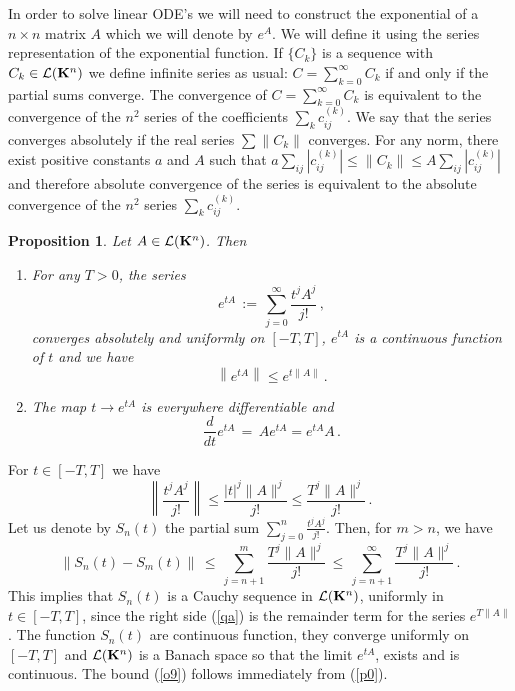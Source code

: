 \documentclass[12pt]{report}
\newcommand{\calL}{{\cal L}}
\newcommand{\bK}{{\bf K}}
\newtheorem{prop}[theorem]{Proposition}
\newcommand{\proof}{\noindent {\em Proof:~}}
\def\eqref#1{(\ref{#1})}
\def\to{\rightarrow}
\begin{document}
In order to solve linear ODE's we will need to construct the
exponential of a $n \times n$ matrix $A$ which we will denote by
$e^A$.  We will define it using the series representation of the
exponential function.  If $\{C_k\}$ is a sequence with $C_k \in
\calL(\bK^n)$ we define infinite series as usual: $C
=\sum_{k=0}^\infty C_k$ if and only if the partial sums converge.  The
convergence of $C =\sum_{k=0}^\infty C_k$ is equivalent to the
convergence of the $n^2$ series of the coefficients $\sum_k
c^{(k)}_{ij}$.  We say that the series converges absolutely if the
real series $\sum \|C_k\|$ converges. For any norm, there exist
positive constants $a$ and $A$ such that $a \sum_{ij}|c^{(k)}_{ij}| \le \|C_k
\| \le A \sum_{ij} |c^{(k)}_{ij}|$ and therefore absolute
convergence of the series is equivalent to the absolute convergence of
the $n^2$ series $\sum_k c^{(k)}_{ij}$.


\begin{prop}\label{linexp} Let $A \in \calL(\bK^n)$. Then
\begin{enumerate}
\item For any $T>0$, the series 
\begin{equation}
e^{tA} \, :=\, \sum_{j=0}^{\infty} \frac{t^j A^j}{j!} \,,
\end{equation}
converges absolutely and uniformly on $[-T,T]$, $e^{tA}$ is a
continuous function of $t$ and we have
\begin{equation}\label{o9}
\left\| e^{tA} \right\| \le e^{t\|A\|}\,.
\end{equation}
\item The map $t \to e^{tA}$ is everywhere differentiable and 
\begin{equation}\label{dii}
\frac{d}{dt} e^{tA} \,=\, A e^{tA} = e^{t A} A \,.
\end{equation}
\end{enumerate}
\end{prop}

\proof  {\em Item 1.} For $t \in  [-T,T]$ we have 
\begin{equation} \label{p0}
\left \| \frac{t^j A^j}{j!} \right\| \le \frac{ |t|^j \|A\|^j}{j!} \le  
\frac{ T^j \|A\|^j }{j!} \,.
\end{equation}
Let us denote by $S_n(t)$ the partial sum $\sum_{j=0}^{n} \frac{t^j
A^j}{j!}$. Then, for $m > n$, we have
\begin{equation}\label{qa}
\| S_n(t) - S_m(t)\| \,\le\, \sum_{j=n+1}^m \frac{ T^j \|A\|^j }{j!}
\,\le \, \sum_{j=n+1}^\infty \frac{ T^j \|A\|^j }{j!} \,.
\end{equation}
This implies that $S_n(t)$ is a Cauchy sequence in $\calL(\bK^n)$,
uniformly in $t \in [-T,T]$, since the right side \eqref{qa} is the
remainder term for the series $e^{T \|A\|}$. The function $S_n(t)$ are
continuous function, they converge uniformly on $[-T,T]$ and
$\calL(\bK^n)$ is a Banach space so that the limit $e^{tA}$, exists
and is continuous.  The bound \eqref{o9} follows immediately from
\eqref{p0}.
\end{document}
